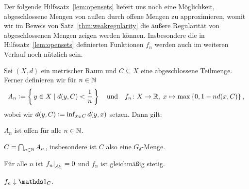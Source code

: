 \documentclass[../main/main.tex]{subfiles}
\begin{document}
	Der folgende Hilfssatz~\ref{lem:opensets} liefert uns noch eine Möglichkeit, 
	abgeschlossene Mengen von außen durch offene Mengen zu approximieren, womit wir im 
	Beweis von Satz~\ref{thm:weakregularity} die äußere Regularität von abgeschlossenen 
	Mengen zeigen werden können. Insbesondere die in Hilfssatz~\ref{lem:opensets} definierten 
	Funktionen $f_n$ werden  auch im weiteren Verlauf noch nützlich sein.
	
	\begin{Hilfssatz}
		\label{lem:opensets}
		Sei $(X, d)$ ein metrischer Raum und $C \subseteq X$ eine abgeschlossene 
		Teilmenge. Ferner definieren wir für $n \in \mathbb{N}$
		$$ A_n \vcentcolon = \left\{\, y \in X \; | \; d(y, C) < \frac{1}{n} \,\right\} \quad \text{und} \quad 
		f_n \colon X \to \mathbb{R}, \; x \mapsto \max \left\{0, 1-n d(x, C)\right\}  \text{,}$$
		wobei wir $d(y, C) \vcentcolon = \inf_{x \in C} d(y, x)$ setzen.
		Dann gilt:
		\begin{enumeratethm}
			\item $A_n$ ist offen für alle $n \in \mathbb{N}$.
			\item $C = \bigcap_{n \in \mathbb{N}} A_n$, insbesondere ist $C$ also eine $G_\delta$-Menge.
			\item Für alle $n$ ist $\left.f_n\right|_{A_n^\mathsf{c}} = 0$ und $f_n$ ist gleichmäßig stetig.
			\item $f_n \convdown \indfct_C$.
		\end{enumeratethm}
	\end{Hilfssatz}
\end{document}
